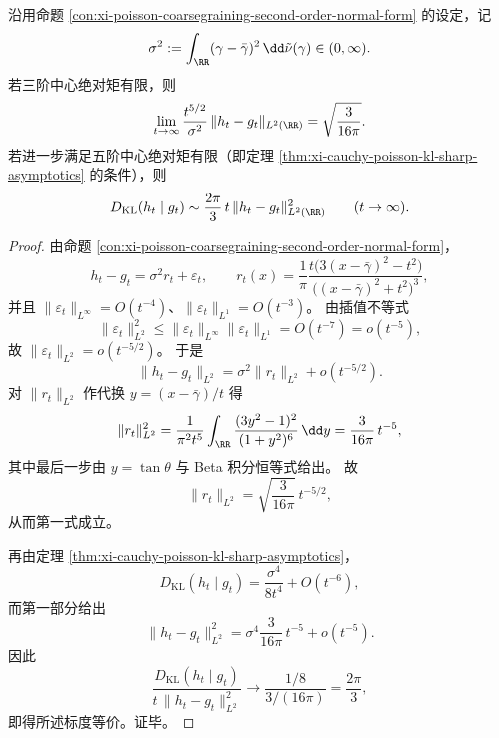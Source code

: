 \begin{theorem}\label{thm:xi-cauchy-poisson-l2-sharp-kl-scaling}
沿用命题 \ref{con:xi-poisson-coarsegraining-second-order-normal-form} 的设定，记
\[
\sigma^2:=\int_{\RR}(\gamma-\bar\gamma)^2\,\dd\tilde\nu(\gamma)\in(0,\infty).
\]
若三阶中心绝对矩有限，则
\[
\lim_{t\to\infty}\frac{t^{5/2}}{\sigma^2}\,\|h_t-g_t\|_{L^2(\RR)}
=\sqrt{\frac{3}{16\pi}}.
\]
若进一步满足五阶中心绝对矩有限（即定理 \ref{thm:xi-cauchy-poisson-kl-sharp-asymptotics} 的条件），则
\[
D_{\mathrm{KL}}(h_t\mid g_t)\sim \frac{2\pi}{3}\,t\,\|h_t-g_t\|_{L^2(\RR)}^2
\qquad(t\to\infty).
\]
\end{theorem}
\begin{proof}
由命题 \ref{con:xi-poisson-coarsegraining-second-order-normal-form}，
\[
h_t-g_t=\sigma^2 r_t+\varepsilon_t,
\qquad
r_t(x)=\frac{1}{\pi}\frac{t\bigl(3(x-\bar\gamma)^2-t^2\bigr)}{\bigl((x-\bar\gamma)^2+t^2\bigr)^3},
\]
并且 \(\|\varepsilon_t\|_{L^\infty}=O(t^{-4})\)、\(\|\varepsilon_t\|_{L^1}=O(t^{-3})\)。
由插值不等式
\[
\|\varepsilon_t\|_{L^2}^2\le \|\varepsilon_t\|_{L^\infty}\|\varepsilon_t\|_{L^1}=O(t^{-7})=o(t^{-5}),
\]
故 \(\|\varepsilon_t\|_{L^2}=o(t^{-5/2})\)。
于是
\[
\|h_t-g_t\|_{L^2}
=\sigma^2\|r_t\|_{L^2}+o(t^{-5/2}).
\]
对 \(\|r_t\|_{L^2}\) 作代换 \(y=(x-\bar\gamma)/t\) 得
\[
\|r_t\|_{L^2}^2
=\frac{1}{\pi^2 t^5}
\int_{\RR}\frac{(3y^2-1)^2}{(1+y^2)^6}\,\dd y
=\frac{3}{16\pi}\,t^{-5},
\]
其中最后一步由 \(y=\tan\theta\) 与 Beta 积分恒等式给出。
故
\[
\|r_t\|_{L^2}=\sqrt{\frac{3}{16\pi}}\,t^{-5/2},
\]
从而第一式成立。
\par
再由定理 \ref{thm:xi-cauchy-poisson-kl-sharp-asymptotics}，
\[
D_{\mathrm{KL}}(h_t\mid g_t)=\frac{\sigma^4}{8t^4}+O(t^{-6}),
\]
而第一部分给出
\[
\|h_t-g_t\|_{L^2}^2
=\sigma^4\frac{3}{16\pi}\,t^{-5}+o(t^{-5}).
\]
因此
\[
\frac{D_{\mathrm{KL}}(h_t\mid g_t)}{t\,\|h_t-g_t\|_{L^2}^2}
\to
\frac{1/8}{3/(16\pi)}
=\frac{2\pi}{3},
\]
即得所述标度等价。证毕。
\end{proof}



\endinput

